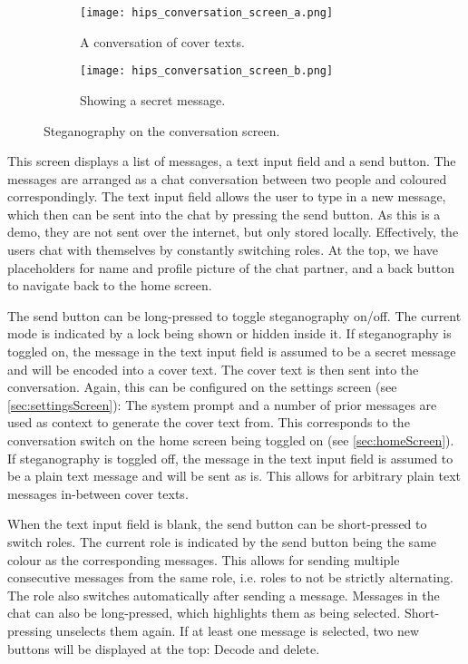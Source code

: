 \begin{figure}
	\begin{wide}
		\captionsetup{width=\linewidth}
		\begin{subfigure}{0.45\linewidth}
			\centering
			\texttt{[image: hips\_conversation\_screen\_a.png]}
			\caption{A conversation of cover texts.}
			\label{fig:conversationScreenA}
		\end{subfigure}
        \hfill
		\begin{subfigure}{0.45\linewidth}
			\centering
			\texttt{[image: hips\_conversation\_screen\_b.png]}
			\caption{Showing a secret message.}
			\label{fig:conversationScreenB}
		\end{subfigure}
		\caption[HiPS: Conversation screen]{Steganography on the conversation screen.}
		\label{fig:conversationScreen}
	\end{wide}
\end{figure}

This screen displays a list of messages, a text input field and a send button. The messages are arranged as a chat conversation between two people and coloured correspondingly. The text input field allows the user to type in a new message, which then can be sent into the chat by pressing the send button. As this is a demo, they are not sent over the internet, but only stored locally. Effectively, the users chat with themselves by constantly switching roles. At the top, we have placeholders for name and profile picture of the chat partner, and a back button to navigate back to the home screen.

The send button can be long-pressed to toggle steganography on/off. The current mode is indicated by a lock being shown or hidden inside it. If steganography is toggled on, the message in the text input field is assumed to be a secret message and will be encoded into a cover text. The cover text is then sent into the conversation. Again, this can be configured on the settings screen (see \cref{sec:settingsScreen}): The system prompt and a number of prior messages are used as context to generate the cover text from. This corresponds to the conversation switch on the home screen being toggled on (see \cref{sec:homeScreen}). If steganography is toggled off, the message in the text input field is assumed to be a plain text message and will be sent as is. This allows for arbitrary plain text messages in-between cover texts.

When the text input field is blank, the send button can be short-pressed to switch roles. The current role is indicated by the send button being the same colour as the corresponding messages. This allows for sending multiple consecutive messages from the same role, i.e. roles to not be strictly alternating. The role also switches automatically after sending a message. Messages in the chat can also be long-pressed, which highlights them as being selected. Short-pressing unselects them again. If at least one message is selected, two new buttons will be displayed at the top: Decode and delete.


